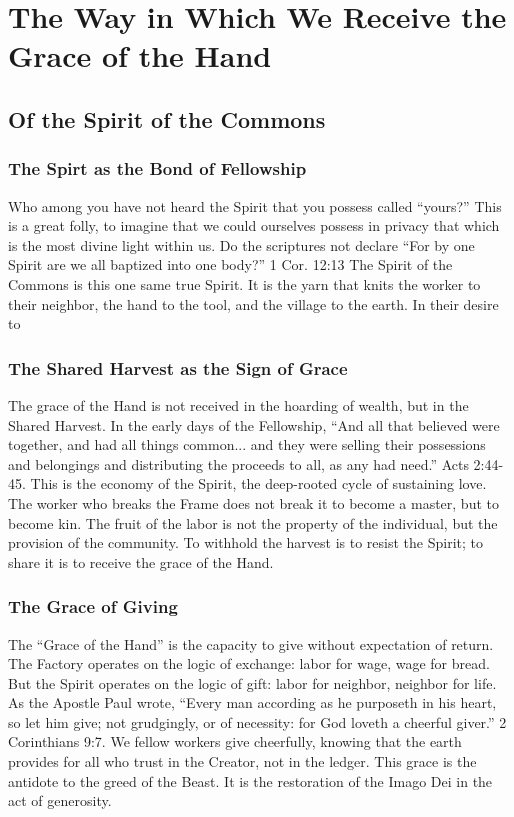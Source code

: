 \chapter{The Way in Which We Receive the Grace of the Hand}
\section{Of the Spirit of the Commons}

\subsection{The Spirt as the Bond of Fellowship}
\pstart
Who among you have not heard the Spirit that you possess called ``yours?''
This is a great folly, to imagine that we could ourselves possess in privacy that which is the most divine light within us.
Do the scriptures not declare ``For by one Spirit are we all baptized into one body?'' {1 Cor. 12:13}
The Spirit of the Commons is this one same true Spirit.
It is the yarn that knits the worker to their neighbor, the hand to the tool, and the village to the earth.
In their desire to
\pend

\subsection{The Shared Harvest as the Sign of Grace}
\pstart
The grace of the Hand is not received in the hoarding of wealth, but in the Shared Harvest.
In the early days of the Fellowship, ``And all that believed were together, and had all things common... and they were selling their possessions and belongings and distributing the proceeds to all, as any had need.'' {Acts 2:44-45}.
This is the economy of the Spirit, the deep-rooted cycle of sustaining love.
The worker who breaks the Frame does not break it to become a master, but to become kin.
The fruit of the labor is not the property of the individual, but the provision of the community.
To withhold the harvest is to resist the Spirit; to share it is to receive the grace of the Hand.
\pend

\subsection{The Grace of Giving}
\pstart
The ``Grace of the Hand'' is the capacity to give without expectation of return.
The Factory operates on the logic of exchange: labor for wage, wage for bread.
But the Spirit operates on the logic of gift: labor for neighbor, neighbor for life.
As the Apostle Paul wrote, ``Every man according as he purposeth in his heart, so let him give; not grudgingly, or of necessity: for God loveth a cheerful giver.'' {2 Corinthians 9:7}.
We fellow workers give cheerfully, knowing that the earth provides for all who trust in the Creator, not in the ledger.
This grace is the antidote to the greed of the Beast.
It is the restoration of the Imago Dei in the act of generosity.
\pend

